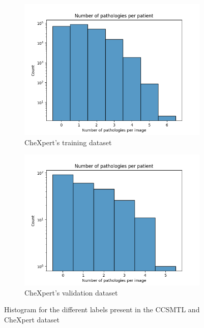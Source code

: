 \documentclass[11pt]{article}
\begin{document}
\begin{figure}[H]
     \begin{subfigure}[b]{0.45\linewidth}
         \centering
         \includegraphics[width=\linewidth]{plots/disease_count_chexpert_train}
         \caption{CheXpert's training dataset}
         \vspace{4ex}
         \label{fig:count_chexpert_train}
     \end{subfigure}
     \hfill
     \begin{subfigure}[b]{0.45\linewidth}
         \centering
         \includegraphics[width=\linewidth]{plots/disease_count_chexpert_valid}
         \caption{CheXpert's validation dataset}
         \vspace{4ex}
         \label{fig:count_chexpert_valid}
     \end{subfigure}
     \label{fig:classes_per_image}
     \caption{Histogram for the different labels present in the CCSMTL and CheXpert dataset}

\end{figure}
    
\end{document}
